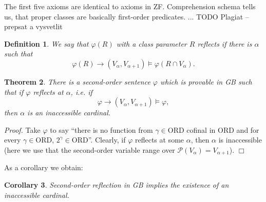 \documentclass[12pt,a4paper]{article}
\newtheorem{theorem}{Theorem}[section]
\newtheorem{definition}[theorem]{Definition}
\newtheorem{Cor}[theorem]{Corollary}
\newenvironment{proof}
{\noindent \textit{Proof.}}
{\hspace*{\fill} $\Box$}
\newcommand{\power}[1]{\ensuremath{\mathscr{P}} (#1)}
\newcommand{\then}{\rightarrow}
\newcommand{\mx}{\mathrm}
\begin{document}
The first five axioms are identical to axioms in ZF. \newline
Comprehension schema tells us, that proper classes are basically first-order predicates.
...
 TODO Plagiat -- prepsat a vysvetlit
 
\begin{definition}\label{def:reflBG}
We say that $\varphi(R)$ with a class parameter $R$ reflects if there is $\alpha$ such that
\begin{equation}
\varphi(R) \then (V_\alpha,V_{\alpha+1})\models \varphi(R\cap V_\alpha).
\end{equation} 
\end{definition}


\begin{theorem}\label{th:refl01}
There is a second-order sentence $\varphi$ which is provable in {\sf GB} such that if $\varphi$ reflects at $\alpha$, i.e. if
\begin{equation}
\varphi \then (V_\alpha,V_{\alpha+1}) \models \varphi,
\end{equation}
then $\alpha$ is an inaccessible cardinal.
\end{theorem}

\begin{proof}
Take $\varphi$ to say ``there is no function from $\gamma \in \mx{ORD}$ cofinal in $\mx{ORD}$ and for every $\gamma \in \mx{ORD}$, $2^\gamma \in \mx{ORD}$''. Clearly, if $\varphi$ reflects at some $\alpha$, then $\alpha$ is inaccessible (here we use that the second-order variable range over $\power{V_\alpha} = V_{\alpha+1}$).
\end{proof}

As a corollary we obtain:

\begin{Cor}\label{cor:refl01}
Second-order reflection in {\sf GB} implies the existence of an inaccessible cardinal.
\end{Cor}
\end{document}
